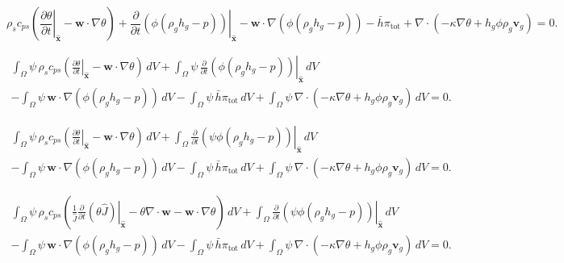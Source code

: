 \documentclass[11pt]{article}
\begin{document}
\begin{equation}
\rho_{s} c_{ps} \left( \left.\frac{\partial \theta}{\partial t}\right|_{\widehat{\mathbf{x}}} - \mathbf{w}\cdot\nabla \theta \right)
+ \left.\frac{\partial}{\partial t}\left( \phi(\rho_g h_g - p) \right)\right|_{\widehat{\mathbf{x}}}
- \mathbf{w}\cdot\nabla\left( \phi(\rho_g h_g - p) \right)
- \bar{h} \pi_{\mathrm{tot}}
+ \nabla \cdot
\left(
 -\kappa\nabla \theta + h_g \phi \rho_{g} \mathbf{v}_{g}
\right)
= 0.
\end{equation}

\begin{multline}
\int_{\Omega}
\psi\,\rho_{s} c_{ps} \left( \left.\frac{\partial \theta}{\partial t}\right|_{\widehat{\mathbf{x}}} - \mathbf{w}\cdot\nabla \theta \right)\,dV
+ \int_{\Omega}
\psi\,\left.\frac{\partial}{\partial t}\left( \phi(\rho_g h_g - p) \right)\right|_{\widehat{\mathbf{x}}}\,dV
\\
- \int_{\Omega}
\psi\,\mathbf{w}\cdot\nabla\left( \phi(\rho_g h_g - p) \right)\,dV
- \int_{\Omega}
\psi\,\bar{h} \pi_{\mathrm{tot}}\,dV
+ \int_{\Omega}
\psi\,\nabla \cdot
\left(
 -\kappa\nabla \theta + h_g \phi \rho_{g} \mathbf{v}_{g}
\right)\,dV
= 0.
\end{multline}

\begin{multline}
\int_{\Omega}
\psi\,\rho_{s} c_{ps} \left( \left.\frac{\partial \theta}{\partial t}\right|_{\widehat{\mathbf{x}}} - \mathbf{w}\cdot\nabla \theta \right)\,dV
+ \int_{\Omega}
 \left.\frac{\partial}{\partial t}\left(\psi \phi(\rho_g h_g - p) \right)\right|_{\widehat{\mathbf{x}}}\,dV
\\
- \int_{\Omega}
\psi\,\mathbf{w}\cdot\nabla\left( \phi(\rho_g h_g - p) \right)\,dV
- \int_{\Omega}
\psi\,\bar{h} \pi_{\mathrm{tot}}\,dV
+ \int_{\Omega}
\psi\,\nabla \cdot
\left(
 -\kappa\nabla \theta + h_g \phi \rho_{g} \mathbf{v}_{g}
\right)\,dV
= 0.
\end{multline}

\begin{multline}
\int_{\Omega}
\psi\,\rho_{s} c_{ps} \left( \frac{1}{\widehat{J}} \left. \frac{\partial}{\partial t} \left( \theta \widehat{J} \right)\right|_{\widehat{\mathbf{x}}} - \theta \nabla \cdot \mathbf{w} - \mathbf{w} \cdot \nabla \theta \right)\,dV
+ \int_{\Omega}
 \left.\frac{\partial}{\partial t}\left(\psi \phi(\rho_g h_g - p) \right)\right|_{\widehat{\mathbf{x}}}\,dV
\\
- \int_{\Omega}
\psi\,\mathbf{w}\cdot\nabla\left( \phi(\rho_g h_g - p) \right)\,dV
- \int_{\Omega}
\psi\,\bar{h} \pi_{\mathrm{tot}}\,dV
+ \int_{\Omega}
\psi\,\nabla \cdot
\left(
 -\kappa\nabla \theta + h_g \phi \rho_{g} \mathbf{v}_{g}
\right)\,dV
= 0.
\end{multline}
\end{document}
